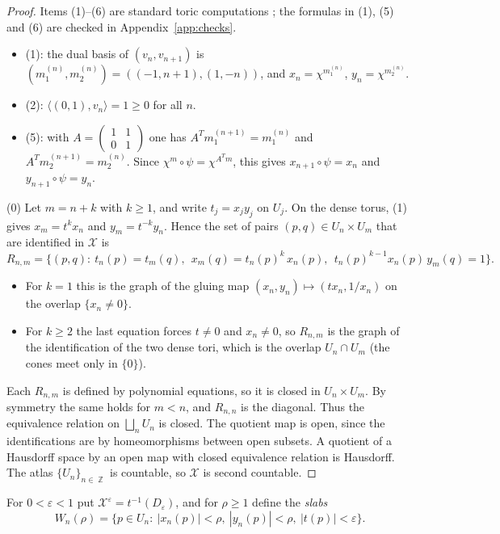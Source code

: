 \documentclass{article}
\DeclareMathOperator{\Z}{\mathbb{Z}}
\theoremstyle{definition}
\theoremstyle{plain}
\newcommand{\cX}{\mathcal{X}}
\begin{document}
\begin{proof}
Items (1)--(6) are standard toric computations \cite{Fulton93}; the formulas in (1),
(5) and (6) are checked in Appendix~\ref{app:checks}.
\begin{itemize}
\item (1): the dual basis of $(v_n,v_{n+1})$ is
  $(m^{(n)}_1,m^{(n)}_2)=((-1,n+1),(1,-n))$, and $x_n=\chi^{m^{(n)}_1}$,
  $y_n=\chi^{m^{(n)}_2}$.
\item (2): $\langle(0,1),v_n\rangle=1\ge0$ for all $n$.
\item (5): with $A=\begin{pmatrix}1&1\\0&1\end{pmatrix}$ one has
  $A^Tm^{(n+1)}_1=m^{(n)}_1$ and $A^Tm^{(n+1)}_2=m^{(n)}_2$. Since
  $\chi^m\circ\psi=\chi^{A^Tm}$, this gives $x_{n+1}\circ\psi=x_n$ and
  $y_{n+1}\circ\psi=y_n$.
\end{itemize}
(0) Let $m=n+k$ with $k\ge1$, and write $t_j=x_jy_j$ on $U_j$. On the dense torus,
(1) gives $x_m=t^kx_n$ and $y_m=t^{-k}y_n$. Hence the set of pairs
$(p,q)\in U_n\times U_m$ that are identified in $\cX$ is
\[R_{n,m}=\big\{(p,q):\ t_n(p)=t_m(q),\ \ x_m(q)=t_n(p)^k\,x_n(p),\ \ t_n(p)^{k-1}x_n(p)\,y_m(q)=1\big\}.\]
\begin{itemize}
\item For $k=1$ this is the graph of the gluing map $(x_n,y_n)\mapsto(tx_n,1/x_n)$ on
  the overlap $\{x_n\neq0\}$.
\item For $k\ge2$ the last equation forces $t\ne0$ and $x_n\ne0$, so $R_{n,m}$ is the
  graph of the identification of the two dense tori, which is the overlap
  $U_n\cap U_m$ (the cones meet only in $\{0\}$).
\end{itemize}
Each $R_{n,m}$ is defined by polynomial equations, so it is closed in $U_n\times U_m$.
By symmetry the same holds for $m<n$, and $R_{n,n}$ is the diagonal. Thus the
equivalence relation on $\bigsqcup_nU_n$ is closed. The quotient map is open,
since the identifications are by homeomorphisms between open subsets. A quotient of a
Hausdorff space by an open map with closed equivalence relation is Hausdorff. The atlas
$\{U_n\}_{n\in\Z}$ is countable, so $\cX$ is second countable.
\end{proof}

For $0<\varepsilon<1$ put $\cX^\varepsilon=t^{-1}(D_\varepsilon)$, and for $\rho\ge1$ define the
\emph{slabs}
\[W_n(\rho)=\{p\in U_n:\ |x_n(p)|<\rho,\ |y_n(p)|<\rho,\ |t(p)|<\varepsilon\}.\]
\end{document}
